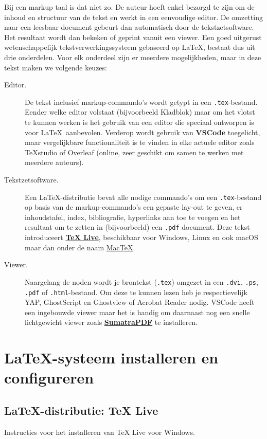 \documentclass[kulak]{kulakarticle} %
\begin{document}
Bij een markup taal is dat niet zo. De auteur hoeft enkel bezorgd te zijn om de inhoud en structuur van de tekst en werkt in een eenvoudige editor. De omzetting naar een leesbaar document gebeurt dan automatisch door de tekstzetsoftware. Het resultaat wordt dan bekeken of geprint vanuit een viewer. Een goed uitgerust wetenschappelijk tekstverwerkingssysteem gebaseerd op \LaTeX, bestaat dus uit drie onderdelen. Voor elk onderdeel zijn er meerdere mogelijkheden, maar in deze tekst maken we volgende keuzes:
\begin{description}
	\item[Editor.] De tekst inclusief markup-commando's wordt getypt in een \texttt{.tex}-bestand. Eender welke editor volstaat (bijvoorbeeld Kladblok) maar om het vlotst te kunnen werken is het gebruik van een editor die speciaal ontworpen is voor \LaTeX\ aanbevolen. Verderop wordt gebruik van \textbf{VSCode} toegelicht, maar vergelijkbare functionaliteit is te vinden in elke actuele editor zoals TeXstudio of Overleaf (online, zeer geschikt om samen te werken met meerdere auteurs).
	\item[Tekstzetsoftware.] Een \LaTeX-distributie bevat alle nodige commando's om een \texttt{.tex}-bestand op basis van de markup-commando's een gepaste lay-out te geven, er inhoudstafel, index, bibliografie, hyperlinks aan toe te voegen  en het resultaat om te zetten in (bijvoorbeeld) een \texttt{.pdf}-document. Deze tekst introduceert \href{http://www.tug.org/texlive/}{\textbf{TeX Live}}, beschikbaar voor Windows, Linux en ook macOS maar dan onder de naam \href{http://www.tug.org/mactex}{MacTeX}.
	\item[Viewer.] Naargelang de noden wordt je brontekst (\texttt{.tex}) omgezet in een \texttt{.dvi}, \texttt{.ps}, \texttt{.pdf} of \texttt{.html}-bestand. Om deze te kunnen lezen heb je respectievelijk YAP, GhostScript en Ghostview of Acrobat Reader nodig. VSCode heeft een ingebouwde viewer maar het is handig om daarnaast nog een snelle lichtgewicht viewer zoals \href{https://www.sumatrapdfreader.org/}{\textbf{SumatraPDF}} te installeren.
\end{description}

\section{\LaTeX-systeem installeren en configureren}
\label{sec:texlive}
\subsection{\LaTeX-distributie: TeX Live}
Instructies voor het installeren van TeX Live voor Windows.
\end{document}
